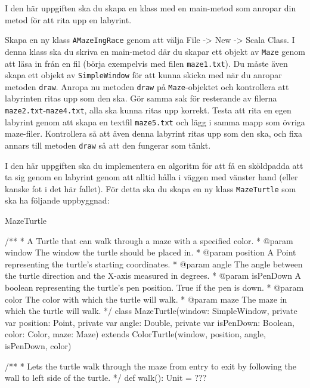 \Task I den här uppgiften ska du skapa en klass med en main-metod som anropar din metod för att rita upp en labyrint.

\Subtask Skapa en ny klass \texttt{AMazeIngRace} genom att välja File -> New -> Scala Class. I denna klass ska du skriva en main-metod där du skapar ett objekt av \texttt{Maze} genom att läsa in från en fil (börja exempelvis med filen \texttt{maze1.txt}). Du måste även skapa ett objekt av \texttt{SimpleWindow} för att kunna skicka med när du anropar metoden \texttt{draw}. Anropa nu metoden \texttt{draw} på \texttt{Maze}-objektet och kontrollera att labyrinten ritas upp som den ska. Gör samma sak för resterande av filerna \texttt{maze2.txt}-\texttt{maze4.txt}, alla ska kunna ritas upp korrekt. Testa att rita en egen labyrint genom att skapa en textfil \texttt{maze5.txt} och lägg i samma mapp som övriga maze-filer. Kontrollera så att även denna labyrint ritas upp som den ska, och fixa annars till metoden \texttt{draw} så att den fungerar som tänkt.


\Task I den här uppgiften ska du implementera en algoritm för att få en sköldpadda att ta sig genom en labyrint genom att alltid hålla i väggen med vänster hand (eller kanske fot i det här fallet). För detta ska du skapa en ny klass \texttt{MazeTurtle} som ska ha följande uppbyggnad:


\begin{ScalaSpec}{MazeTurtle}

/**
 * A Turtle that can walk through a maze with a specified color.
 * @param window     The window the turtle should be placed in.
 * @param position   A Point representing the turtle's starting coordinates.
 * @param angle      The angle between the turtle direction and the X-axis 
 measured in degrees.
 * @param isPenDown  A boolean representing the turtle's pen position. 
 True if the pen is down.
 * @param color		   The color with which the turtle will walk.
 * @param maze	     The maze in which the turtle will walk.
 */
class MazeTurtle(window: SimpleWindow, private var position: Point, private var angle: Double, private var isPenDown: Boolean, color: Color, maze: Maze) extends ColorTurtle(window, position, angle, isPenDown, color) {

  /**
   * Lets the turtle walk through the maze from entry to exit by 
   following the wall to left side of the turtle.
   */
  def walk(): Unit = ???

}

\end{ScalaSpec}

